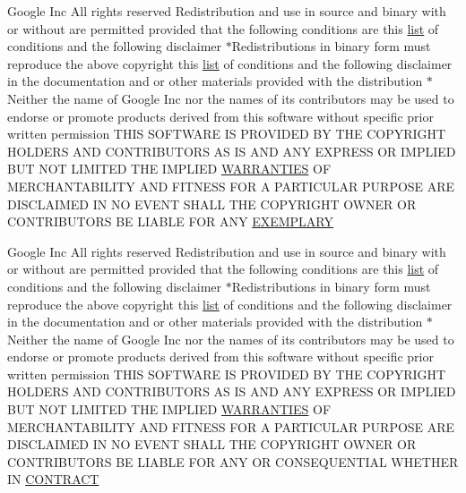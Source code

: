 \begin{DoxyCompactItemize}
\item 
Google Inc All rights reserved Redistribution and use in source and binary with or without are permitted provided that the following conditions are this \hyperlink{CMakeLists_8txt_a548e427ae9357a6f3536cff3ca23efda}{list} of conditions and the following disclaimer $\ast$Redistributions in binary form must reproduce the above copyright this \hyperlink{CMakeLists_8txt_a548e427ae9357a6f3536cff3ca23efda}{list} of conditions and the following disclaimer in the documentation and or other materials provided with the distribution $\ast$Neither the name of Google Inc nor the names of its contributors may be used to endorse or promote products derived from this software without specific prior written permission T\+H\+IS S\+O\+F\+T\+W\+A\+RE IS P\+R\+O\+V\+I\+D\+ED BY T\+HE C\+O\+P\+Y\+R\+I\+G\+HT H\+O\+L\+D\+E\+RS A\+ND C\+O\+N\+T\+R\+I\+B\+U\+T\+O\+RS AS IS A\+ND A\+NY E\+X\+P\+R\+E\+SS OR I\+M\+P\+L\+I\+ED B\+UT N\+OT L\+I\+M\+I\+T\+ED T\+HE I\+M\+P\+L\+I\+ED \hyperlink{COPYING_8txt_ac62ff2f8b2f565a26b35ecca12f17f4a}{W\+A\+R\+R\+A\+N\+T\+I\+ES} OF M\+E\+R\+C\+H\+A\+N\+T\+A\+B\+I\+L\+I\+TY A\+ND F\+I\+T\+N\+E\+SS F\+OR A P\+A\+R\+T\+I\+C\+U\+L\+AR P\+U\+R\+P\+O\+SE A\+RE D\+I\+S\+C\+L\+A\+I\+M\+ED IN NO E\+V\+E\+NT S\+H\+A\+LL T\+HE C\+O\+P\+Y\+R\+I\+G\+HT O\+W\+N\+ER OR C\+O\+N\+T\+R\+I\+B\+U\+T\+O\+RS BE L\+I\+A\+B\+LE F\+OR A\+NY \hyperlink{COPYING_8txt_a414e855741ab5e799596c3a09878ad27}{E\+X\+E\+M\+P\+L\+A\+RY}
\item 
Google Inc All rights reserved Redistribution and use in source and binary with or without are permitted provided that the following conditions are this \hyperlink{CMakeLists_8txt_a548e427ae9357a6f3536cff3ca23efda}{list} of conditions and the following disclaimer $\ast$Redistributions in binary form must reproduce the above copyright this \hyperlink{CMakeLists_8txt_a548e427ae9357a6f3536cff3ca23efda}{list} of conditions and the following disclaimer in the documentation and or other materials provided with the distribution $\ast$Neither the name of Google Inc nor the names of its contributors may be used to endorse or promote products derived from this software without specific prior written permission T\+H\+IS S\+O\+F\+T\+W\+A\+RE IS P\+R\+O\+V\+I\+D\+ED BY T\+HE C\+O\+P\+Y\+R\+I\+G\+HT H\+O\+L\+D\+E\+RS A\+ND C\+O\+N\+T\+R\+I\+B\+U\+T\+O\+RS AS IS A\+ND A\+NY E\+X\+P\+R\+E\+SS OR I\+M\+P\+L\+I\+ED B\+UT N\+OT L\+I\+M\+I\+T\+ED T\+HE I\+M\+P\+L\+I\+ED \hyperlink{COPYING_8txt_ac62ff2f8b2f565a26b35ecca12f17f4a}{W\+A\+R\+R\+A\+N\+T\+I\+ES} OF M\+E\+R\+C\+H\+A\+N\+T\+A\+B\+I\+L\+I\+TY A\+ND F\+I\+T\+N\+E\+SS F\+OR A P\+A\+R\+T\+I\+C\+U\+L\+AR P\+U\+R\+P\+O\+SE A\+RE D\+I\+S\+C\+L\+A\+I\+M\+ED IN NO E\+V\+E\+NT S\+H\+A\+LL T\+HE C\+O\+P\+Y\+R\+I\+G\+HT O\+W\+N\+ER OR C\+O\+N\+T\+R\+I\+B\+U\+T\+O\+RS BE L\+I\+A\+B\+LE F\+OR A\+NY OR C\+O\+N\+S\+E\+Q\+U\+E\+N\+T\+I\+AL W\+H\+E\+T\+H\+ER IN \hyperlink{COPYING_8txt_ae5f46c55ceb68d912e61fe0ba637a1c9}{C\+O\+N\+T\+R\+A\+CT}

\end{DoxyCompactItemize}
